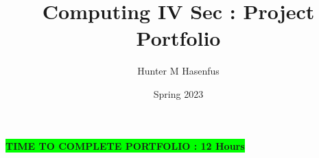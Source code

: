 \documentclass[12pt]{article}
\author{Hunter M Hasenfus}
\date{Spring 2023}
\title{Computing IV Sec \secno: Project Portfolio}
\begin{document}
\maketitle

\tableofcontents


\vfill
\textbf{\colorbox{lime}{TIME TO COMPLETE PORTFOLIO : 12 Hours}}

\newpage

 
\newpage

\newpage

\newpage

\newpage

\newpage

\newpage

\newpage

\newpage

\newpage

\newpage

\end{document}
